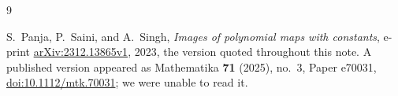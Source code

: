 \documentclass[11pt]{amsart}
\theoremstyle{remark}
\begin{document}
\begin{thebibliography}{9}

S.~Panja, P.~Saini, and A.~Singh,
\emph{Images of polynomial maps with constants},
e-print \href{https://arxiv.org/abs/2312.13865v1}{arXiv:2312.13865v1}, 2023,
the version quoted throughout this note. A published version appeared as
Mathematika \textbf{71} (2025), no.~3, Paper e70031,
\href{https://doi.org/10.1112/mtk.70031}{doi:10.1112/mtk.70031}; we were
unable to read it.

\end{thebibliography}
\end{document}
